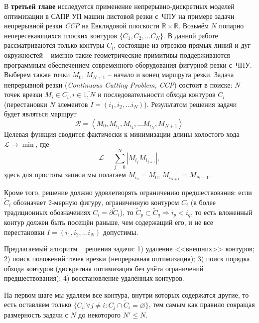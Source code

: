 
В {\bf третьей главе}
исследуется
применение непрерывно-дискретных моделей оптимизации
в САПР УП машин листовой резки с~ЧПУ
на примере
задачи непрерывной резки {\it CCP}
на Евклидовой плоскости
$\mathbb R \times \mathbb R$.
Возьмём
$N$
попарно непересекающихся плоских контуров
$\{C_1, C_2, ... C_N\}$.
В данной работе рассматриваются только контуры
$C_i$,
состоящие из
отрезков прямых линий и дуг окружностей
--
именно такие геометрические примитивы
поддерживаются программным обеспечением
современного оборудования фигурной резки с~ЧПУ.
Выберем также точки
$M_0$, $M_{N + 1}$
--
начало и конец
маршрута резки.
Задача непрерывной резки
({\it Continuous Cutting Problem, CCP})
состоит в поиске:
$N$ точек врезки $M_i \in C_i, i \in \overline{1, N}$
и последовательности обхода контуров
$C_i$
(перестановки
$N$
элементов
$I = (i_1, i_2, ... i_N)$).
Результатом решения задачи будет являться маршрут
\begin{equation}
  \label{eq:route}
  \mathcal R =
  \left<M_0, M_{i_1}, M_{i_2}, \dots M_{i_N}, M_{N + 1}\right>
\end{equation}
Целевая функция
сводится фактически к минимизации длины холостого хода
$
\mathcal{L} \to \min
$,
где
\begin{equation}
  \mathcal{L} = \sum_{j=0}^N|M_{i_j}M_{i_{j+1}}|
  ,
  \label{air-move-length}
\end{equation}
здесь для простоты записи мы полагаем
$M_{i_0} = M_0$,
$M_{i_{N + 1}} = M_{N + 1}$.

Кроме того, решение должно удовлетворять ограничению предшествования:
если
$\widetilde C_i$
обозначает 2-мерную фигуру,
ограниченную контуром
$C_i$
(в более традиционных обозначениях
$C_i = \partial \widetilde C_i$),
то
$
 \widetilde C_p \subset \widetilde C_q \Rightarrow i_p < i_q
$,
то есть вложенный контур должен быть посещён раньше,
чем содержащий его,
и не все перестановки
$I = (i_1, i_2, ... i_N)$
допустимы.

Предлагаемый алгоритм
~\cite{berlin2019,bi:ccp:ru}
решения задачи:
1) удаление <<внешних>> контуров;
2) поиск положений точек врезки (непрерывная оптимизация);
3) поиск порядка обхода контуров (дискретная оптимизация без учёта ограничений предшествования);
4) восстановление удалённых контуров.

На первом шаге мы удаляем все контура,
внутри которых содержатся другие,
то есть оставляем только
$
\{C_i \vert \forall j \ne i\colon C_j \cap \widetilde C_i = \varnothing \}
$,
тем самым как правило сокращая размерность задачи с $N$
до некоторого $N' \leqslant N$.

